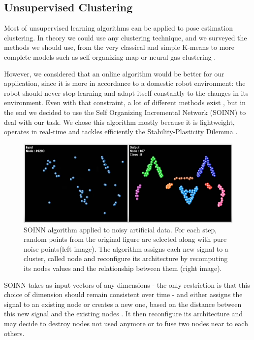 \subsection{Unsupervised Clustering}
\label{section:SOINN}
Most of unsupervised learning algorithms can be applied to pose estimation clustering. In theory we could use any clustering technique, and we surveyed the methods we should use, from the very classical and simple K-means \cite{k_means} to more complete models such as self-organizing map \cite{self_organizing_map} or neural gas clustering \cite{neural_gas}.

However, we considered that an online algorithm would be better for our application, since it is more in accordance to a domestic robot environment: the robot should never stop learning and adapt itself constantly to the changes in its environment. Even with that constraint, a lot of different methods exist \cite{online_clustering_algo}, but in the end we decided to use the Self Organizing Incremental Network (SOINN) \cite{SOINN} to deal with our task. We chose this algorithm mostly because it is lightweight, operates in real-time and tackles efficiently the Stability-Plasticity Dilemma \cite{stability-plasticity_dilemma}. 

\begin{figure}[htp]
    \centering
    \includegraphics[width=150mm, keepaspectratio]{images/SOINN_cat.png}
    \caption[SOINN algorithm applied to noisy artificial data]{SOINN algorithm applied to noisy artificial data. For each step, random points from the original figure are selected along with pure noise points(left image). The algorithm assigns each new signal to a cluster, called node and reconfigure its architecture by recomputing its nodes values and the relationship between them (right image).}
    \label{fig:SOINN_cat}
\end{figure}

SOINN takes as input vectors of any dimensions - the only restriction is that this choice of dimension should remain consistent over time - and either assigns the signal to an existing node or creates a new one, based on the distance between this new signal and the existing nodes . It then reconfigure its architecture and may decide to destroy nodes not used anymore or to fuse two nodes near to each others.

